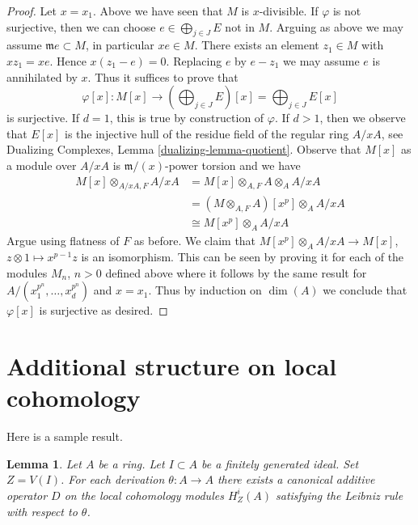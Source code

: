 \documentclass{stacks-project}
\theoremstyle{plain}
\newtheorem{lemma}[subsection]{Lemma}
\theoremstyle{definition}
\theoremstyle{remark}
\numberwithin{equation}{subsection}
\begin{document}
\begin{proof}
\medskip\noindent
Let $x = x_1$. Above we have seen that $M$ is $x$-divisible.
If $\varphi$ is not surjective, then we can choose
$e \in \bigoplus_{j \in J} E$ not in $M$.
Arguing as above we may assume $\mathfrak m e \subset M$,
in particular $x e \in M$. There exists an element
$z_1 \in M$ with $x z_1 = x e$. Hence
$x(z_1 - e) = 0$. Replacing $e$ by $e - z_1$
we may assume $e$ is annihilated by $x$.
Thus it suffices to prove that
$$
\varphi[x] :
M[x]
\longrightarrow
\left(\bigoplus\nolimits_{j \in J} E\right)[x] =
\bigoplus\nolimits_{j \in J} E[x]
$$
is surjective. If $d = 1$, this is true by construction of $\varphi$.
If $d > 1$, then we observe that $E[x]$ is the injective hull
of the residue field of the regular ring $A/xA$, see
Dualizing Complexes, Lemma \ref{dualizing-lemma-quotient}.
Observe that $M[x]$ as a module over $A/xA$
is $\mathfrak m/(x)$-power torsion and we have
\begin{align*}
M[x] \otimes_{A/xA, F} A/xA
& = M[x] \otimes_{A, F} A \otimes_A A/xA \\
& = (M \otimes_{A, F} A)[x^p] \otimes_A A/xA \\
& \cong M[x^p] \otimes_A A/xA
\end{align*}
Argue using flatness of $F$ as before.
We claim that $M[x^p] \otimes_A A/xA \to M[x]$,
$z \otimes 1 \mapsto x^{p - 1}z$ is an isomorphism.
This can be seen by proving it for
each of the modules $M_n$, $n > 0$ defined above
where it follows by the same result for
$A/(x_1^{p^n}, \ldots, x_d^{p^n})$ and $x = x_1$.
Thus by induction on $\dim(A)$ we conclude that $\varphi[x]$
is surjective as desired.
\end{proof}





\section{Additional structure on local cohomology}
\label{section-additional}

\noindent
Here is a sample result.

\begin{lemma}
\label{lemma-derivation}
Let $A$ be a ring. Let $I \subset A$ be a finitely generated ideal.
Set $Z = V(I)$.
For each derivation $\theta : A \to A$ there exists a canonical
additive operator $D$ on the local cohomology modules
$H^i_Z(A)$ satisfying the Leibniz rule with respect to $\theta$.
\end{lemma}
\end{document}
